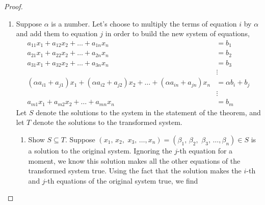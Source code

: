 \begin{proof}
\begin{enumerate}
\begin{enumerate}
%
\item Now show $T\subseteq S$.  Suppose $(x_1,\,x_2,\,\,x_3,\,\ldots,x_n)=(\beta_1,\,\beta_2,\,\,\beta_3,\,\ldots,\beta_n)\in T$ is a solution to the transformed system.  Ignoring the $i$-th equation for a moment, we know it makes all the other equations of the original system true.  We also know that
%
\begin{align*}
\alpha a_{i1}\beta_1+\alpha a_{i2}\beta_2+\alpha a_{i3}\beta_3+\dots+\alpha a_{in}\beta_n&=\alpha b_i
%
\intertext{which we can multiply by $\tfrac{1}{\alpha}$, since $\alpha\neq 0$, to get}
%
a_{i1}\beta_1+a_{i2}\beta_2+a_{i3}\beta_3+\dots+a_{in}\beta_n&=b_i\\
\end{align*}
%
This says that the $i$-th equation of the original system is also true, so we have established that $(\beta_1,\,\beta_2,\,\,\beta_3,\,\ldots,\beta_n)\in S$, and therefore $T\subseteq S$.  Locate the key point where we required that $\alpha\neq 0$, and consider what would happen if $\alpha=0$.
%
\end{enumerate}
\item  Suppose $\alpha$ is a number.  Let's choose to multiply the terms of equation $i$ by $\alpha$ and add them to equation $j$ in order to build the new system of equations,
%
\begin{align*}
a_{11}x_1+a_{12}x_2+\dots+a_{1n}x_n&=b_1\\
a_{21}x_1+a_{22}x_2+\dots+a_{2n}x_n&=b_2\\
a_{31}x_1+a_{32}x_2+\dots+a_{3n}x_n&=b_3\\
&\vdots\\
(\alpha a_{i1}+a_{j1})x_1+(\alpha a_{i2}+a_{j2})x_2+\dots+(\alpha a_{in}+a_{jn})x_n&=\alpha b_i+b_{j}\\
&\vdots\\
a_{m1}x_1+a_{m2}x_2+\dots+a_{mn}x_n&=b_m
\end{align*}
%
Let $S$ denote the solutions to the system in the statement of the theorem, and let $T$ denote the solutions to the transformed system.
\begin{enumerate}
%
\item Show $S\subseteq T$.  Suppose $(x_1,\,x_2,\,\,x_3,\,\ldots,x_n)=(\beta_1,\,\beta_2,\,\,\beta_3,\,\ldots,\beta_n)\in S$ is a solution to the original system.  Ignoring the $j$-th equation for a moment, we know this solution makes all the other equations of the transformed system true.  Using the fact that the solution makes the $i$-th and $j$-th equations of the original system true, we find

\end{enumerate}
\end{enumerate}
\end{proof}

